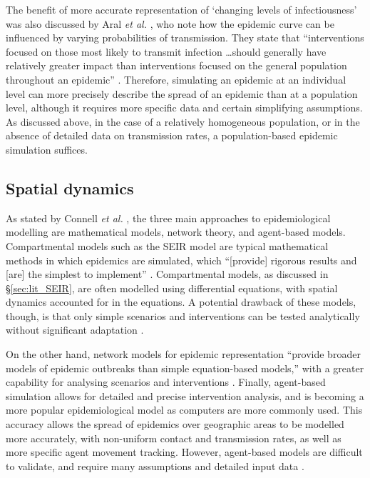 The benefit of more accurate representation of `changing levels of infectiousness' was also discussed by Aral \textit{et al.} \cite{aral1996overview}, who note how the epidemic curve can be influenced by varying probabilities of transmission. They state that ``interventions focused on those most likely to transmit infection \dots should generally have relatively greater impact than interventions focused on the general population throughout an epidemic'' \cite{aral1996overview}. Therefore, simulating an epidemic at an individual level can more precisely describe the spread of an epidemic than at a population level, although it requires more specific data and certain simplifying assumptions. As discussed above, in the case of a relatively homogeneous population, or in the absence of detailed data on transmission rates, a population-based epidemic simulation suffices.

\subsection{Spatial dynamics}
As stated by Connell \textit{et al.} \cite{connell2009comparison}, the three main approaches to epidemiological modelling are mathematical models, network theory, and agent-based models. Compartmental models such as the SEIR model are typical mathematical methods in which epidemics are simulated, which ``[provide] rigorous results and [are] the simplest to implement'' \cite{connell2009comparison}. Compartmental models, as discussed in \S \ref{sec:lit_SEIR}, are often modelled using differential equations, with spatial dynamics accounted for in the equations. A potential drawback of these models, though, is that only simple scenarios and interventions can be tested analytically without significant adaptation \cite{connell2009comparison}. 

On the other hand, network models for epidemic representation ``provide broader models of epidemic outbreaks than simple equation-based models,'' with a greater capability for analysing scenarios and interventions \cite{connell2009comparison}. 
Finally, agent-based simulation allows for detailed and precise intervention analysis, and is becoming a more popular epidemiological model as computers are more commonly used. This accuracy allows the spread of epidemics over geographic areas to be modelled more accurately, with non-uniform contact and transmission rates, as well as more specific agent movement tracking. However, agent-based models are difficult to validate, and require many assumptions and detailed input data \cite{connell2009comparison}.

